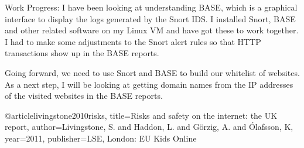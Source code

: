 Work Progress:
I have been looking at understanding BASE, which is a graphical interface to display the logs generated by the Snort IDS. I installed Snort, BASE and other related software on my Linux VM and have got these to work together. I had to make some adjustments to the Snort alert rules so that HTTP transactions show up in the BASE reports.

Going forward, we need to use Snort and BASE to build our whitelist of websites. As a next step, I will be looking at getting domain names from the IP addresses of the visited websites in the BASE reports.

@article{livingstone2010risks,
  title={Risks and safety on the internet: the UK report},
  author={Livingstone, S. and Haddon, L. and Görzig, A. and Ólafsson, K},
  year={2011},
  publisher={LSE, London: EU Kids Online}
}